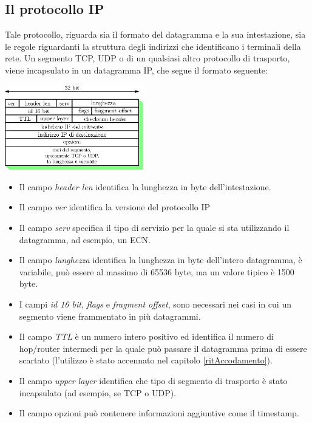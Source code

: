 \documentclass[12pt, letterpaper]{article}
\begin{document}
\subsection{Il protocollo IP}
Tale protocollo, riguarda sia il formato del datagramma e la sua intestazione, sia le regole riguardanti la struttura 
degli indirizzi che identificano i terminali della rete. Un segmento TCP, UDP o di un qualsiasi altro protocollo di trasporto, 
viene incapsulato in un datagramma IP, che segue il formato seguente:\begin{center}
    \includegraphics[width=0.45\textwidth ]{images/ipDatagram.eps}
\end{center}
\begin{itemize}
    \item Il campo \textit{header len} identifica la lunghezza in byte dell'intestazione.
    \item Il campo \textit{ver} identifica la versione del protocollo IP 
    \item Il campo \textit{serv} specifica il tipo di servizio per la quale si sta utilizzando il datagramma, ad esempio, un ECN. 
    \item Il campo \textit{lunghezza} identifica la lunghezza in byte dell'intero datagramma, è variabile, può essere 
    al massimo di 65536 byte, ma un valore tipico è 1500 byte.
    \item I campi \textit{id 16 bit}, \textit{flags} e \textit{fragment offset}, sono necessari nei casi in cui 
    un segmento viene frammentato in più datagrammi. 
    \item Il campo \textit{TTL} è un numero intero positivo ed identifica il numero di hop/router intermedi per la quale può passare 
    il datagramma prima di essere scartato (l'utilizzo è stato accennato nel capitolo \ref{ritAccodamento}).
    \item Il campo \textit{upper layer} identifica che tipo di segmento di trasporto è stato incapsulato (ad esempio, se TCP o UDP).
    \item Il campo opzioni può contenere informazioni aggiuntive come il timestamp.
\end{itemize}
\end{document}
